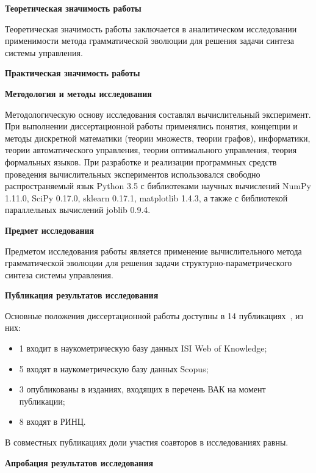 \textbf{Теоретическая значимость работы}

Теоретическая значимость работы заключается в аналитическом исследовании применимости метода грамматической эволюции для решения задачи синтеза системы управления.

\textbf{Практическая значимость работы}


\textbf{Методология и методы исследования}

Методологическую основу исследования составлял вычислительный эксперимент.
При выполнении диссертационной работы применялись понятия, концепции и методы дискретной математики (теории множеств, теории графов), информатики, теории автоматического управления, теории оптимального управления, теория формальных языков. При разработке и реализации программных средств проведения вычислительных экспериментов использовался свободно распространяемый язык Python 3.5 с библиотеками научных вычислений NumPy 1.11.0, SciPy 0.17.0, sklearn 0.17.1, matplotlib 1.4.3, а также с библиотекой параллельных вычислений joblib 0.9.4. 

\textbf{Предмет исследования}

Предметом исследования работы является применение вычислительного метода грамматической эволюции для решения задачи структурно-параметрического синтеза системы управления.

\textbf{Публикация результатов исследования}

Основные положения диссертационной работы доступны в 14 публикациях~\cite{DanDiKaSo2015,DivKazSof2014,DivKazSof2013,DivKazSof2013a,ДанДиКаСо2014,ДивееКаза2013,ДивееКаза2012,Казарян2013,Казарян2014,Казарян2014a,КазКулЖар2010,КазХамКоч2014,КулЖарКаз2010}, из них:
\begin{itemize}
    \item 1 входит в наукометрическую базу данных ISI Web of Knowledge;
    \item 5 входят в наукометрическую базу данных Scopus;
    \item 3 опубликованы в изданиях, входящих в перечень ВАК на момент публикации;
    \item 8 входят в РИНЦ.
\end{itemize}

В совместных публикациях доли участия соавторов в исследованиях равны.

\textbf{Апробация результатов исследования}

